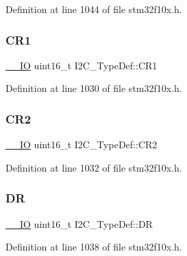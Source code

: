 Definition at line 1044 of file stm32f10x.\+h.

\mbox{\label{struct_i2_c___type_def_ad35ea0b199cefb757de20e9b78168534}} 
\subsubsection{\texorpdfstring{C\+R1}{CR1}}
{\footnotesize\ttfamily \hyperlink{core__sc300_8h_aec43007d9998a0a0e01faede4133d6be}{\+\_\+\+\_\+\+IO} uint16\+\_\+t I2\+C\+\_\+\+Type\+Def\+::\+C\+R1}



Definition at line 1030 of file stm32f10x.\+h.

\mbox{\label{struct_i2_c___type_def_ac8bff45acc455489620d50e697a24c9d}} 
\subsubsection{\texorpdfstring{C\+R2}{CR2}}
{\footnotesize\ttfamily \hyperlink{core__sc300_8h_aec43007d9998a0a0e01faede4133d6be}{\+\_\+\+\_\+\+IO} uint16\+\_\+t I2\+C\+\_\+\+Type\+Def\+::\+C\+R2}



Definition at line 1032 of file stm32f10x.\+h.

\mbox{\label{struct_i2_c___type_def_a5c1551b886fbb8e801b9203f6d7dc7c5}} 
\subsubsection{\texorpdfstring{DR}{DR}}
{\footnotesize\ttfamily \hyperlink{core__sc300_8h_aec43007d9998a0a0e01faede4133d6be}{\+\_\+\+\_\+\+IO} uint16\+\_\+t I2\+C\+\_\+\+Type\+Def\+::\+DR}



Definition at line 1038 of file stm32f10x.\+h.

\mbox{\label{struct_i2_c___type_def_ad218fdcb9606477c1d63f8ee38d3c5c9}} 
